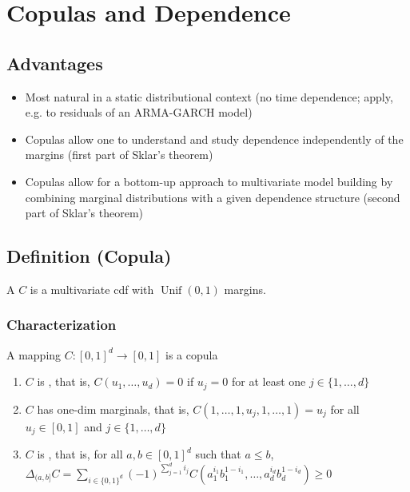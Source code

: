 \section{Copulas and Dependence}


\subsection*{Advantages}
\begin{itemize}[leftmargin=*]
    \item Most natural in a static distributional context
(no time dependence; apply, e.g. to residuals of an ARMA-GARCH model)
    \item Copulas allow one to understand and study dependence independently of the margins (first part of Sklar's theorem)
    \item Copulas allow for a bottom-up approach to multivariate model building by combining marginal distributions with a given dependence structure (second part of Sklar's theorem)
\end{itemize}


\subsection*{Definition (Copula)}
A  $C$ is a multivariate cdf with $\operatorname{Unif}(0,1)$ margins.

\subsubsection*{Characterization}
A mapping $C:[0,1]^{d} \rightarrow[0,1]$ is a copula 
\begin{enumerate}[label = (\arabic*), leftmargin=*]
    \item $C$ is , that is, $C\left(u_{1}, \ldots, u_{d}\right)=0$ if $u_{j}=0$ for at least one $j \in\{1, \ldots, d\}$
    \item $C$ has  one-dim marginals, that is, $C\left(1, \ldots, 1, u_{j}, 1, \ldots, 1\right)=u_{j}$ for all $u_{j} \in[0,1]$ and $j \in\{1, \ldots, d\}$
    \item $C$ is , that is, for all $a, b \in[0,1]^{d}$ such that $a \leq b$,
$
\displaystyle \Delta_{(a, b]} C=\sum_{i \in\{0,1\}^{d}}(-1)^{\sum_{j=1}^{d} i_{j}} C\left(a_{1}^{i_{1}} b_{1}^{1-i_{1}}, \ldots, a_{d}^{i_{d}} b_{d}^{1-i_{d}}\right) \geq 0
$
\end{enumerate}

